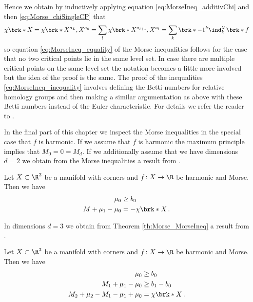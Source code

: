 Hence we obtain by inductively applying equation \eqref{eq:MorseIneq_additivChi}
and then \eqref{eq:Morse_chiSingleCP} that
\begin{align*}
  \chi\brk*{X}=\chi\brk*{X^{a_L},X^{a_0}}=\sum_l \chi\brk*{X^{a_{l+1}},X^{a_l}}
  =\sum_k\brk*{-1}^k\ind^\text{M}_k\brk*{f}
\end{align*}
so equation \eqref{eq:MorseIneq_equality} of the Morse inequalities follows
for the case that no two critical points lie in the same level set.
In case there are multiple critical points on the same level set the notation
becomes a little more involved but the idea of the proof is the same.
The proof of the inequalities \eqref{eq:MorseIneq_inequality} involves defining the
Betti numbers for relative homology groups and then making a similar argumentation
as above with these Betti numbers instead of the Euler characteristic. For details we refer the reader to \cite[§5]{Milnor1963}.


In the final part of this chapter we inspect the Morse inequalities in the special case
that $f$ is harmonic.
If we assume that $f$ is harmonic the maximum principle implies that
$M_0=0=M_d$.
If we additionally assume that we have dimensions $d=2$ we obtain from the Morse inequalities
a result from \cite[Corollary 10.1]{Morse1969}.
\begin{corollary}
  Let $X\subset\R^2$ be a manifold with corners and $f\colon X\to\R$ be harmonic and Morse.
  Then we have
  \begin{align*}
    \mu_0&\geq b_0 \\
    M+\mu_1-\mu_0&=-\chi\brk*{X}\,.
  \end{align*}
\end{corollary}
In dimensions $d=3$ we obtain from Theorem \ref{th:Morse_MorseIneq} a result from \cite[Corollary 10.2]{Morse1969}.
\begin{corollary}
  Let $X\subset\R^3$ be a manifold with corners and $f\colon X\to\R$ be harmonic and Morse.
  Then we have
  \begin{align*}
    \mu_0&\geq b_0 \\
    M_1+\mu_1-\mu_0&\geq b_1-b_0 \\
    M_2+\mu_2-M_1-\mu_1+\mu_0&= \chi\brk*{X}\,.
  \end{align*}
\end{corollary}


